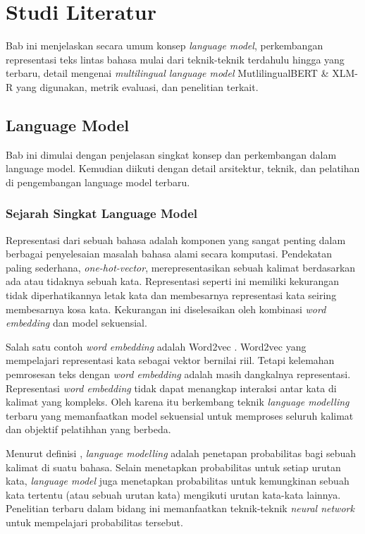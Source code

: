 \chapter{Studi Literatur}

Bab ini menjelaskan secara umum konsep \textit{language model}, perkembangan representasi teks lintas bahasa mulai dari teknik-teknik terdahulu hingga yang terbaru, detail mengenai \textit{multilingual language model} MutlilingualBERT \& XLM-R yang digunakan, metrik evaluasi, dan penelitian terkait. 

\section{Language Model}
    Bab ini dimulai dengan penjelasan singkat konsep dan perkembangan dalam language model. Kemudian diikuti dengan detail arsitektur, teknik, dan pelatihan di pengembangan language model terbaru.

    \subsection{Sejarah Singkat Language Model}
    Representasi dari sebuah bahasa adalah komponen yang sangat penting dalam berbagai penyelesaian masalah bahasa alami secara komputasi. Pendekatan paling sederhana, \textit{one-hot-vector},  merepresentasikan sebuah kalimat berdasarkan ada atau tidaknya sebuah kata. Representasi seperti ini memiliki kekurangan tidak diperhatikannya letak kata dan membesarnya representasi kata seiring membesarnya kosa kata. Kekurangan ini diselesaikan oleh kombinasi \textit{word embedding} dan model sekuensial. 
    
    Salah satu contoh \textit{word embedding} adalah Word2vec \parencite{MikolovWord2vec}. Word2vec yang mempelajari representasi kata sebagai vektor bernilai riil. Tetapi kelemahan pemrosesan teks dengan \textit{word embedding} adalah masih dangkalnya representasi. Representasi \textit{word embedding} tidak dapat menangkap interaksi antar kata di kalimat yang kompleks. Oleh karena itu berkembang teknik \textit{language modelling} terbaru yang memanfaatkan model sekuensial untuk memproses seluruh kalimat dan objektif pelatihhan yang berbeda. 

    Menurut definisi \parencite{Goldberg_2017}, \textit{language modelling} adalah penetapan probabilitas bagi sebuah kalimat di suatu bahasa. Selain menetapkan probabilitas untuk setiap urutan kata, \textit{language model} juga menetapkan probabilitas untuk kemungkinan sebuah kata tertentu (atau sebuah urutan kata) mengikuti urutan kata-kata lainnya. Penelitian terbaru dalam bidang ini memanfaatkan teknik-teknik \textit{neural network} untuk mempelajari probabilitas tersebut.

